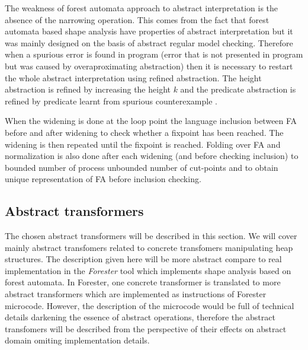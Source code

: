 \documentclass[a4paper, 12pt]{article}
\begin{document}
The weakness of forest automata approach to abstract interpretation is the absence of
the narrowing operation.
This comes from the fact that forest automata based shape analysis have properties
of abstract interpretation but it was mainly designed on the basis of abstract
regular model checking.
Therefore when a spurious error is found in program (error that is not presented in
program but was caused by overaproximating abstraction) then it is necessary
to restart the whole abstract interpretation using refined abstraction.
The height abstraction is refined by increasing the height $k$ and the predicate
abstraction is refined by predicate learnt from spurious counterexample \cite{hruskamt}.

When the widening is done at the loop point the language inclusion between
FA before and after widening to check whether a fixpoint has been reached.
The widening is then repeated until the fixpoint is reached.
Folding over FA and normalization is also done after each widening (and
before checking inclusion) to bounded number of process unbounded number
of cut-points and to obtain unique representation of FA before
inclusion checking.

\subsection{Abstract transformers}
The chosen abstract transformers will be described in this section.
We will cover mainly abstract transfomers related to concrete transfomers
manipulating heap structures.
The description given here will be more abstract compare to real implementation
in the \emph{Forester} \cite{forester} tool which implements shape analysis
based on forest automata.
In Forester, one concrete transformer is translated to more abstract transformers
which are implemented as instructions of Forester microcode.
However, the description of the microcode would be full of technical details
darkening the essence of abstract operations, therefore the abstract transfomers
will be described from the perspective of their effects on abstract domain
omiting implementation details.
\end{document}
